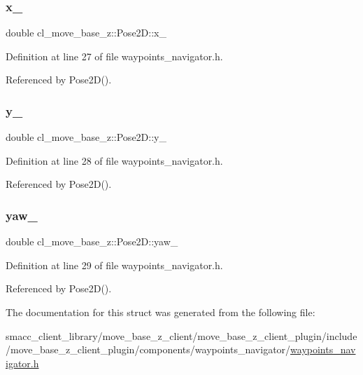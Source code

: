 \subsubsection{\texorpdfstring{x\+\_\+}{x\_}}
{\footnotesize\ttfamily double cl\+\_\+move\+\_\+base\+\_\+z\+::\+Pose2\+D\+::x\+\_\+}



Definition at line 27 of file waypoints\+\_\+navigator.\+h.



Referenced by Pose2\+D().

\mbox{\label{structcl__move__base__z_1_1Pose2D_a745b752ce659fca634aaa386230bb931}} 
\subsubsection{\texorpdfstring{y\+\_\+}{y\_}}
{\footnotesize\ttfamily double cl\+\_\+move\+\_\+base\+\_\+z\+::\+Pose2\+D\+::y\+\_\+}



Definition at line 28 of file waypoints\+\_\+navigator.\+h.



Referenced by Pose2\+D().

\mbox{\label{structcl__move__base__z_1_1Pose2D_aed88c69c4fb64fdca72534843de5350e}} 
\subsubsection{\texorpdfstring{yaw\+\_\+}{yaw\_}}
{\footnotesize\ttfamily double cl\+\_\+move\+\_\+base\+\_\+z\+::\+Pose2\+D\+::yaw\+\_\+}



Definition at line 29 of file waypoints\+\_\+navigator.\+h.



Referenced by Pose2\+D().



The documentation for this struct was generated from the following file\+:\begin{DoxyCompactItemize}
\item 
smacc\+\_\+client\+\_\+library/move\+\_\+base\+\_\+z\+\_\+client/move\+\_\+base\+\_\+z\+\_\+client\+\_\+plugin/include/move\+\_\+base\+\_\+z\+\_\+client\+\_\+plugin/components/waypoints\+\_\+navigator/\hyperlink{waypoints__navigator_8h}{waypoints\+\_\+navigator.\+h}\end{DoxyCompactItemize}
